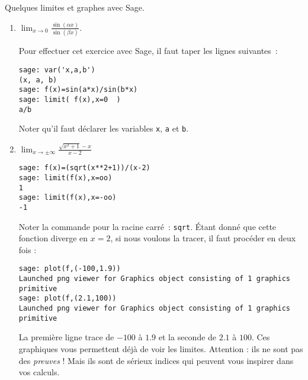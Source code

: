 \begin{example}     \label{ExCWDRooKxnjGL}
    Quelques limites et graphes avec Sage.

    \begin{enumerate}

		\item
			$\lim_{x\to 0} \frac{ \sin(\alpha x) }{ \sin(\beta x) }$.

			Pour effectuer cet exercice avec Sage, il faut taper les lignes suivantes~:

            
\begin{verbatim}
sage: var('x,a,b')
(x, a, b)
sage: f(x)=sin(a*x)/sin(b*x)
sage: limit( f(x),x=0  )
a/b
\end{verbatim}

			Noter qu'il faut déclarer les variables \texttt{x}, \texttt{a} et \texttt{b}.

		\item
			$\lim_{x\to \pm\infty} \frac{ \sqrt{x^2+1}-x }{ x-2 }$

            \begin{verbatim}
sage: f(x)=(sqrt(x**2+1))/(x-2)
sage: limit(f(x),x=oo)
1
sage: limit(f(x),x=-oo)
-1
            \end{verbatim}

			Noter la commande pour la racine carré~: \texttt{sqrt}. Étant donné que cette fonction diverge en $x=2$, si nous voulons la tracer, il faut procéder en deux fois :

            \begin{verbatim}
sage: plot(f,(-100,1.9))
Launched png viewer for Graphics object consisting of 1 graphics primitive
sage: plot(f,(2.1,100))
Launched png viewer for Graphics object consisting of 1 graphics primitive
            \end{verbatim}
			La première ligne trace de $-100$ à $1.9$ et la seconde de $2.1$ à $100$. Ces graphiques vous permettent déjà de voir les limites. Attention : ils ne sont pas des \emph{preuves} ! Mais ils sont de sérieux indices qui peuvent vous inspirer dans vos calculs.

	\end{enumerate}
\end{example}


